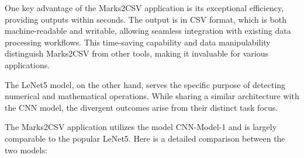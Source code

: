 \noindent One key advantage of the Marks2CSV application is its exceptional efficiency, providing outputs within seconds. The output is in CSV format, which is both machine-readable and writable, allowing seamless integration with existing data processing workflows. This time-saving capability and data manipulability distinguish Marks2CSV from other tools, making it invaluable for various applications.

\noindent The LeNet5 model, on the other hand, serves the specific purpose of detecting numerical and mathematical operations. While sharing a similar architecture with the CNN model, the divergent outcomes arise from their distinct task focus.

\noindent The Marks2CSV application utilizes the model CNN-Model-1 and is largely comparable to the popular LeNet5. Here is a detailed comparison between the two models:\\

